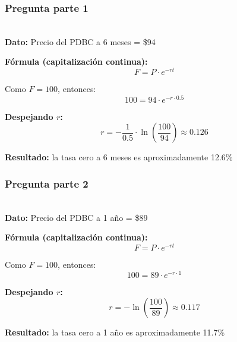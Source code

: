 \documentclass{beamer}
\begin{document}
\begin{frame}
      \frametitle{Pregunta  parte 1}
      \LARGE {} \\[1em]
  
      \footnotesize
      \textbf{Dato:} Precio del PDBC a 6 meses = \$94
  
      \pause
  
      \textbf{Fórmula (capitalización continua):}
      \[
      F = P \cdot e^{-rt}
      \]
  
      \pause
  
      Como $F = 100$, entonces:
      \[
      100 = 94 \cdot e^{-r \cdot 0.5}
      \]
  
      \pause
  
      \textbf{Despejando $r$:}
      \[
      r = -\frac{1}{0.5} \cdot \ln\left(\frac{100}{94}\right) \approx 0.126
      \]
  
      \pause
  
      \textbf{Resultado:} la tasa cero a 6 meses es aproximadamente 12.6\%
\end{frame}
\begin{frame}
      \frametitle{Pregunta  parte 2}
      \LARGE {} \\[1em]
  
      \footnotesize
      \textbf{Dato:} Precio del PDBC a 1 año = \$89
  
      \pause
  
      \textbf{Fórmula (capitalización continua):}
      \[
      F = P \cdot e^{-rt}
      \]
  
      \pause
  
      Como $F = 100$, entonces:
      \[
      100 = 89 \cdot e^{-r \cdot 1}
      \]
  
      \pause
  
      \textbf{Despejando $r$:}
      \[
      r = -\ln\left(\frac{100}{89}\right) \approx 0.117
      \]
  
      \pause
  
      \textbf{Resultado:} la tasa cero a 1 año es aproximadamente 11.7\%
\end{frame}
\end{document}
